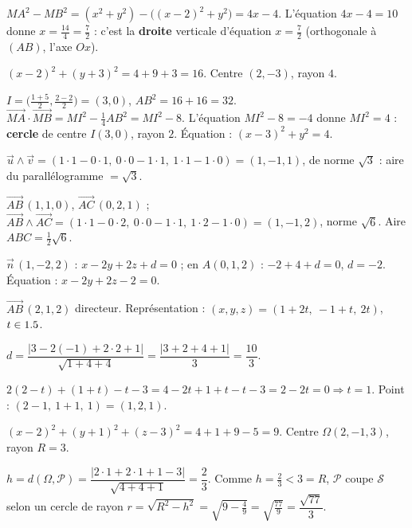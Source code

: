 $MA^{2}-MB^{2}=(x^{2}+y^{2})-\big((x-2)^{2}+y^{2}\big)=4x-4$. L'équation $4x-4=10$
donne $x=\tfrac{14}4=\tfrac72$ : c'est la \textbf{droite} verticale d'équation $x=\tfrac72$
(orthogonale à $(AB)$, l'axe $Ox$).

$(x-2)^{2}+(y+3)^{2}=4+9+3=16$. Centre $(2,-3)$, rayon $4$.

$I=\big(\tfrac{1+5}2,\tfrac{2-2}2\big)=(3,0)$, $AB^{2}=16+16=32$.
$\overrightarrow{MA}\cdot\overrightarrow{MB}=MI^{2}-\tfrac14 AB^{2}=MI^{2}-8$. L'équation
$MI^{2}-8=-4$ donne $MI^{2}=4$ : \textbf{cercle} de centre $I(3,0)$, rayon $2$.
Équation : $(x-3)^{2}+y^{2}=4$.

$\vec u\wedge\vec v=(1\cdot1-0\cdot1,\ 0\cdot0-1\cdot1,\ 1\cdot1-1\cdot0)=(1,-1,1)$, de
norme $\sqrt3$ : aire du parallélogramme $=\sqrt3$.

$\overrightarrow{AB}\,(1,1,0)$, $\overrightarrow{AC}\,(0,2,1)$ ;
$\overrightarrow{AB}\wedge\overrightarrow{AC}=(1\cdot1-0\cdot2,\ 0\cdot0-1\cdot1,\ 1\cdot2-1\cdot0)=(1,-1,2)$,
norme $\sqrt6$. Aire $ABC=\tfrac12\sqrt6$.

$\vec n\,(1,-2,2)$ : $x-2y+2z+d=0$ ; en $A(0,1,2)$ : $-2+4+d=0$, $d=-2$.
Équation : $x-2y+2z-2=0$.

$\overrightarrow{AB}\,(2,1,2)$ directeur. Représentation : $(x,y,z)=(1+2t,\ -1+t,\ 2t)$, $t\in1.5$.

$d=\dfrac{|3-2(-1)+2\cdot2+1|}{\sqrt{1+4+4}}=\dfrac{|3+2+4+1|}{3}=\dfrac{10}{3}$.

$2(2-t)+(1+t)-t-3=4-2t+1+t-t-3=2-2t=0\Rightarrow t=1$. Point : $(2-1,\ 1+1,\ 1)=(1,2,1)$.

$(x-2)^{2}+(y+1)^{2}+(z-3)^{2}=4+1+9-5=9$. Centre $\Omega(2,-1,3)$, rayon $R=3$.

$h=d(\Omega,\mathcal P)=\dfrac{|2\cdot1+2\cdot1+1-3|}{\sqrt{4+4+1}}=\dfrac{2}{3}$.
Comme $h=\tfrac23<3=R$, $\mathcal P$ coupe $\mathcal S$ selon un cercle de rayon
$r=\sqrt{R^{2}-h^{2}}=\sqrt{9-\tfrac49}=\sqrt{\tfrac{77}{9}}=\dfrac{\sqrt{77}}{3}$.

